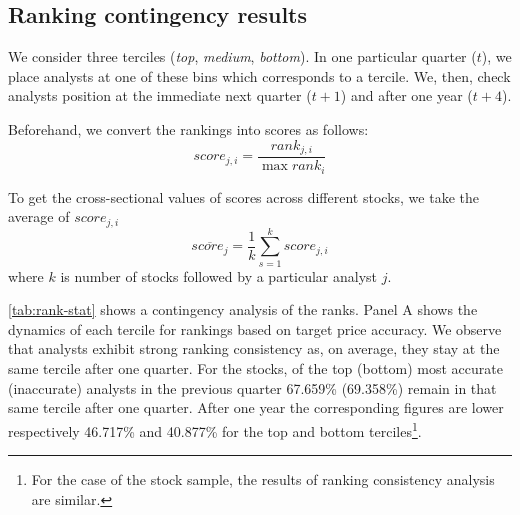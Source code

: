 \documentclass[a4paper,twoside,12pt,openright,notitlepage]{report}\usepackage[]{graphicx}\usepackage[]{color}
\begin{document}
\subsection{Ranking contingency results}
\label{ch1-tab:rank-contin}
We consider  three terciles (\textit{top}, \textit{medium}, \textit{bottom}). In one particular quarter ($t$), we place  analysts at one of these bins which corresponds to a tercile. We, then,  check analysts position at the immediate next quarter ($t+1$) and after one year ($t+4$).

Beforehand, we convert the rankings into scores as follows:
\begin{equation}
\label{eq:score}
score_{j,i}=\frac{rank_{j,i}}{\max{rank_i}}
\end{equation}

To get the cross-sectional values of scores across different stocks, we take the average of $score_{j,i}$
\begin{equation}
\label{eq:mean-score}
\overline{score_{j}}= \frac{1}{k} \sum_{s=1}^{k} score_{j,i}
\end{equation}
where $k$ is number of stocks followed by a particular analyst $j$.

\ref{tab:rank-stat} shows a contingency analysis of the ranks.
Panel A shows the dynamics of each tercile for rankings based on target price  accuracy. We observe that analysts exhibit strong ranking consistency as, on average, they stay at the same tercile after one quarter. For the \all{} stocks,  of the top (bottom) most accurate (inaccurate) analysts in the previous quarter 67.659\% (69.358\%) remain in that same tercile after one quarter. After one year the corresponding figures are lower respectively 46.717\% and 40.877\% for the top and bottom terciles\footnote{For the case of the \same{} stock sample, the results of ranking consistency analysis are similar.}.
\end{document}

